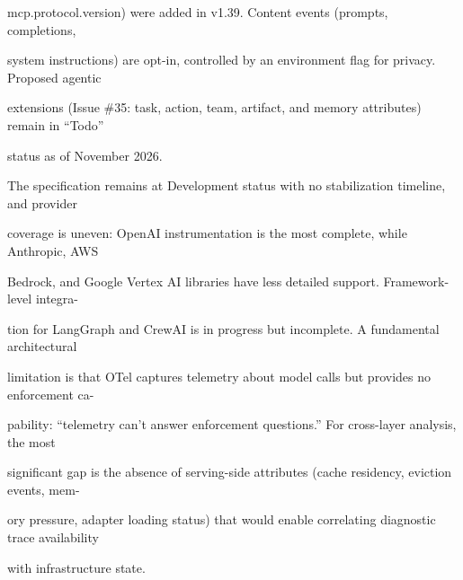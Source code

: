\begin{flushleft}
\noindent mcp.protocol.version) were added in v1.39. Content events (prompts, completions,\par
\noindent system instructions) are opt-in, controlled by an environment flag for privacy. Proposed agentic\par
\noindent extensions (Issue \#35: task, action, team, artifact, and memory attributes) remain in “Todo”\par
\noindent status as of November 2026.\par
\noindent  The specification remains at Development status with no stabilization timeline, and provider\par
\noindent coverage is uneven: OpenAI instrumentation is the most complete, while Anthropic, AWS\par
\noindent Bedrock, and Google Vertex AI libraries have less detailed support. Framework-level integra-\par
\noindent tion for LangGraph and CrewAI is in progress but incomplete. A fundamental architectural\par
\noindent limitation is that OTel captures telemetry about model calls but provides no enforcement ca-\par
\noindent pability: “telemetry can’t answer enforcement questions.” For cross-layer analysis, the most\par
\noindent significant gap is the absence of serving-side attributes (cache residency, eviction events, mem-\par
\noindent ory pressure, adapter loading status) that would enable correlating diagnostic trace availability\par
\noindent with infrastructure state.\par
\end{flushleft}
